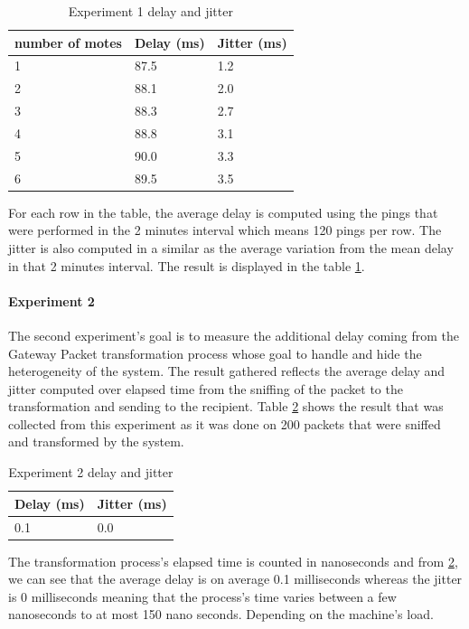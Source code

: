 \documentclass[oneside,12pt,a4paper,final]{book}
\begin{document}
\begin{table}[htbp]
    \begin{tabular}{lll}
    \hline
    number of motes & Delay (ms) & Jitter (ms) \\\hline
    1               & 87.5         & 1.2         \\ 
    2               & 88.1         & 2.0         \\
    3               & 88.3        & 2.7         \\
    4               & 88.8         & 3.1         \\
    5               & 90.0         & 3.3         \\
    6               & 89.5         & 3.5         \\
    \end{tabular}
    \caption{Experiment 1 delay and jitter}
    \label{table:exp1}
\end{table}
For each row in the table, the average delay is computed using the pings that were performed in the 2 minutes interval which means 120 pings per row. The jitter is also computed in a similar as the average variation from the mean delay in that 2 minutes interval. The result is displayed in the table \ref{table:exp1}. 

\paragraph{Experiment 2}
The second experiment's goal is to measure the additional delay coming from the Gateway Packet transformation process whose goal to handle and hide the heterogeneity of the system. The result gathered reflects the average delay and jitter computed over elapsed time from the sniffing of the packet to the transformation and sending to the recipient. Table \ref{table:exp2} shows the result that was collected from this experiment as it was done on 200 packets that were sniffed and transformed by the system.

\begin{table}[htbp]
    \begin{tabular}{ll}
    \hline
    Delay (ms) & Jitter (ms) \\ \hline
    0.1        & 0.0         \\ 
    \end{tabular}
    \caption{Experiment 2 delay and jitter}
        \label{table:exp2}
\end{table}
The transformation process's elapsed time is counted in nanoseconds and from \ref{table:exp2}, we can see that the average delay is on average 0.1 milliseconds whereas the jitter is 0 milliseconds meaning that the process's time varies between a few nanoseconds to at most 150 nano seconds. Depending on the machine's load.
\end{document}
